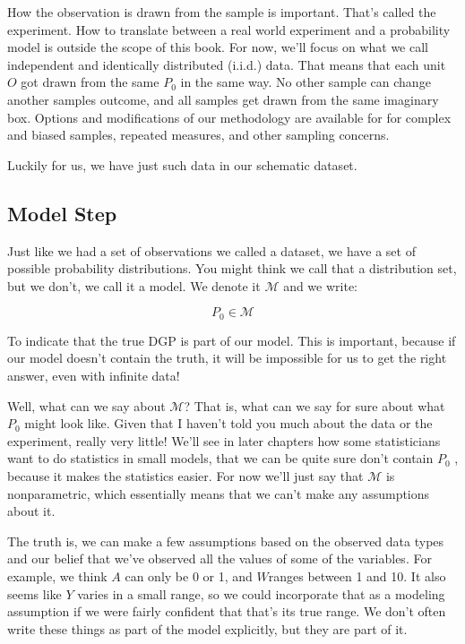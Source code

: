\documentclass[
  12pt, krantz2,
]{krantz}
\theoremstyle{definition}
\theoremstyle{definition}
\theoremstyle{definition}
\newcommand{\1}{\mathbbm{1}}
\begin{document}
How the observation is drawn from the sample is important. That's called the experiment. How to translate between a real world experiment and a probability model is outside the scope of this book. For now, we'll focus on what we call independent and identically distributed (i.i.d.) data. That means that each unit \(O\) got drawn from the same \(P_0\) in the same way. No other sample can change another samples outcome, and all samples get drawn from the same imaginary box. Options and modifications of our methodology are available for for complex and biased samples, repeated measures, and other sampling concerns.

Luckily for us, we have just such data in our schematic dataset.

\hypertarget{model-step}{%
\subsection{Model Step}\label{model-step}}

Just like we had a set of observations we called a dataset, we have a set of possible probability distributions. You might think we call that a distribution set, but we don't, we call it a model. We denote it \(\mathcal{M}\) and we write:

\[P_0 \in \mathcal{M}\]

To indicate that the true DGP is part of our model. This is important, because if our model doesn't contain the truth, it will be impossible for us to get the right answer, even with infinite data!

Well, what can we say about \(\mathcal{M}\)? That is, what can we say for sure about what \(P_0\) might look like. Given that I haven't told you much about the data or the experiment, really very little! We'll see in later chapters how some statisticians want to do statistics in small models, that we can be quite sure don't contain \(P_0\) , because it makes the statistics easier. For now we'll just say that \(\mathcal{M}\) is nonparametric, which essentially means that we can't make any assumptions about it.

The truth is, we can make a few assumptions based on the observed data types and our belief that we've observed all the values of some of the variables. For example, we think \(A\) can only be 0 or 1, and \(W\)ranges between 1 and 10. It also seems like \(Y\) varies in a small range, so we could incorporate that as a modeling assumption if we were fairly confident that that's its true range. We don't often write these things as part of the model explicitly, but they are part of it.
\end{document}
